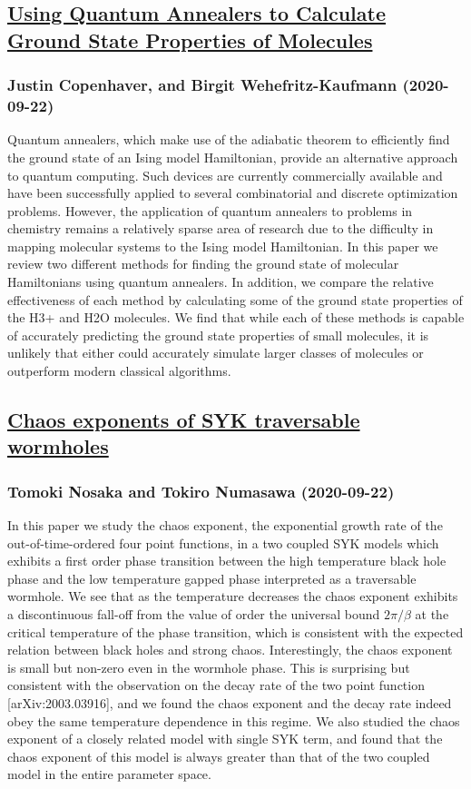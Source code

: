 {\subsection*{\href{http://arxiv.org/abs/2009.10779v1}{Using Quantum Annealers to Calculate Ground State Properties of  Molecules}}
\subsubsection*{Justin Copenhaver, and Birgit Wehefritz-Kaufmann (2020-09-22)}
Quantum annealers, which make use of the adiabatic theorem to efficiently
find the ground state of an Ising model Hamiltonian, provide an alternative
approach to quantum computing. Such devices are currently commercially
available and have been successfully applied to several combinatorial and
discrete optimization problems. However, the application of quantum annealers
to problems in chemistry remains a relatively sparse area of research due to
the difficulty in mapping molecular systems to the Ising model Hamiltonian. In
this paper we review two different methods for finding the ground state of
molecular Hamiltonians using quantum annealers. In addition, we compare the
relative effectiveness of each method by calculating some of the ground state
properties of the H3+ and H2O molecules. We find that while each of these
methods is capable of accurately predicting the ground state properties of
small molecules, it is unlikely that either could accurately simulate larger
classes of molecules or outperform modern classical algorithms.

\subsection*{\href{http://arxiv.org/abs/2009.10759v1}{Chaos exponents of SYK traversable wormholes}}
\subsubsection*{Tomoki Nosaka and Tokiro Numasawa (2020-09-22)}
In this paper we study the chaos exponent, the exponential growth rate of the
out-of-time-ordered four point functions, in a two coupled SYK models which
exhibits a first order phase transition between the high temperature black hole
phase and the low temperature gapped phase interpreted as a traversable
wormhole. We see that as the temperature decreases the chaos exponent exhibits
a discontinuous fall-off from the value of order the universal bound
$2\pi/\beta$ at the critical temperature of the phase transition, which is
consistent with the expected relation between black holes and strong chaos.
Interestingly, the chaos exponent is small but non-zero even in the wormhole
phase. This is surprising but consistent with the observation on the decay rate
of the two point function [arXiv:2003.03916], and we found the chaos exponent
and the decay rate indeed obey the same temperature dependence in this regime.
We also studied the chaos exponent of a closely related model with single SYK
term, and found that the chaos exponent of this model is always greater than
that of the two coupled model in the entire parameter space.

}
